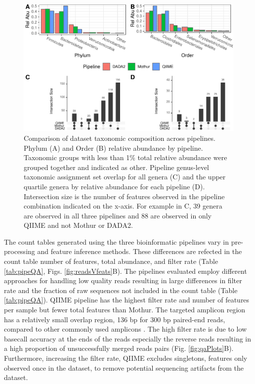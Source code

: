 \documentclass[linenumbers]{bmcart}
\begin{document}
\begin{figure}
\centering
\includegraphics{pipeTaxa-1.pdf}
\caption{\label{fig:pipeTaxa}Comparison of dataset taxonomic composition
across pipelines. Phylum (A) and Order (B) relative abundance by
pipeline. Taxonomic groups with less than 1\% total relative abundance
were grouped together and indicated as other. Pipeline genus-level
taxonomic assignment set overlap for all genera (C) and the upper
quartile genera by relative abundance for each pipeline (D). Intersection size is the number of features observed in the pipeline combination indicated on the x-axis. For example in C, 39 genera are observed in all three pipelines and 88 are observed in only QIIME and not Mothur or DADA2.}
\end{figure}

The count tables generated using the three bioinformatic pipelines vary in pre-processing and feature inference methods. These differences are refected in the count table number of features, total abundance, and filter rate (Table \ref{tab:pipeQA}, Figs. \ref{fig:readsVfeats}B). The
pipelines evaluated employ different approaches for handling low quality
reads resulting in large differences in filter rate and the fraction
of raw sequences not included in the count table (Table
\ref{tab:pipeQA}). QIIME pipeline has the highest filter rate and
number of features per sample but fewer total features than Mothur. The
targeted amplicon region has a relatively small overlap region, 136 bp
for 300 bp paired-end reads, compared to other commonly used amplicons
\cite{kozich2013development, Walters2016-lf}. The high filter rate is
due to low basecall accuracy at the ends of the reads especially the
reverse reads resulting in a high proportion of unsuccessfully merged
reads pairs (Fig. \ref{fig:qaPlots}B). Furthermore, increasing the
filter rate, QIIME excludes singletons, features only observed once in
the dataset, to remove potential sequencing artifacts from the dataset.
\end{document}
